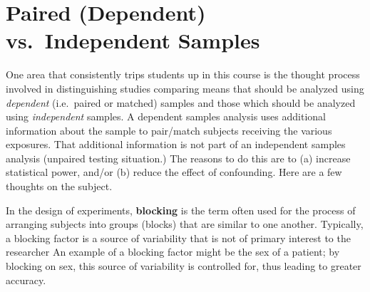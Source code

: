 \documentclass[
]{book}
\begin{document}
\hypertarget{paired-dependent-vs.-independent-samples}{%
\section{Paired (Dependent) vs.~Independent Samples}\label{paired-dependent-vs.-independent-samples}}

One area that consistently trips students up in this course is the thought process involved in distinguishing studies comparing means that should be analyzed using \emph{dependent} (i.e.~paired or matched) samples and those which should be analyzed using \emph{independent} samples. A dependent samples analysis uses additional information about the sample to pair/match subjects receiving the various exposures. That additional information is not part of an independent samples analysis (unpaired testing situation.) The reasons to do this are to (a) increase statistical power, and/or (b) reduce the effect of confounding. Here are a few thoughts on the subject.

In the design of experiments, \textbf{blocking} is the term often used for the process of arranging subjects into groups (blocks) that are similar to one another. Typically, a blocking factor is a source of variability that is not of primary interest to the researcher An example of a blocking factor might be the sex of a patient; by blocking on sex, this source of variability is controlled for, thus leading to greater accuracy.
\end{document}
